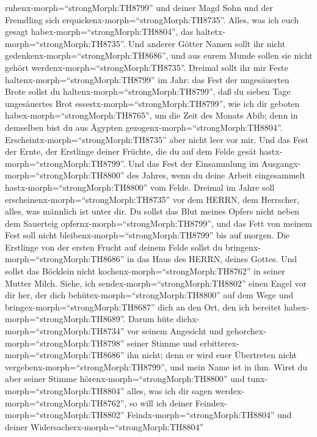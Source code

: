 ruhenx-morph=``strongMorph:TH8799'' und deiner Magd Sohn und der
Fremdling sich erquickenx-morph=``strongMorph:TH8735''. 
Alles, was ich euch gesagt habex-morph=``strongMorph:TH8804'', das
haltetx-morph=``strongMorph:TH8735''. Und anderer Götter Namen sollt ihr
nicht gedenkenx-morph=``strongMorph:TH8686'', und aus eurem Munde sollen
sie nicht gehört werdenx-morph=``strongMorph:TH8735''. 
Dreimal sollt ihr mir Feste haltenx-morph=``strongMorph:TH8799'' im
Jahr:  das Fest der ungesäuerten Brote sollst du
haltenx-morph=``strongMorph:TH8799'', daß du sieben Tage ungesäuertes
Brot essestx-morph=``strongMorph:TH8799'', wie ich dir geboten
habex-morph=``strongMorph:TH8765'', um die Zeit des Monats Abib; denn in
demselben bist du aus Ägypten gezogenx-morph=``strongMorph:TH8804''.
Erscheintx-morph=``strongMorph:TH8735'' aber nicht leer vor mir.
 Und das Fest der Ernte, der Erstlinge deiner Früchte, die
du auf dem Felde gesät hastx-morph=``strongMorph:TH8799''. Und das Fest
der Einsammlung im Ausgangx-morph=``strongMorph:TH8800'' des Jahres,
wenn du deine Arbeit eingesammelt hastx-morph=``strongMorph:TH8800'' vom
Felde.  Dreimal im Jahre soll
erscheinenx-morph=``strongMorph:TH8735'' vor dem HERRN, dem Herrscher,
alles, was männlich ist unter dir.  Du sollst das Blut
meines Opfers nicht neben dem Sauerteig
opfernx-morph=``strongMorph:TH8799'', und das Fett von meinem Fest soll
nicht bleibenx-morph=``strongMorph:TH8799'' bis auf morgen.
 Die Erstlinge von der ersten Frucht auf deinem Felde
sollst du bringenx-morph=``strongMorph:TH8686'' in das Haus des HERRN,
deines Gottes. Und sollst das Böcklein nicht
kochenx-morph=``strongMorph:TH8762'' in seiner Mutter Milch.
 Siehe, ich sendex-morph=``strongMorph:TH8802'' einen Engel
vor dir her, der dich behütex-morph=``strongMorph:TH8800'' auf dem Wege
und bringex-morph=``strongMorph:TH8687'' dich an den Ort, den ich
bereitet habex-morph=``strongMorph:TH8689''.  Darum hüte
dichx-morph=``strongMorph:TH8734'' vor seinem Angesicht und
gehorchex-morph=``strongMorph:TH8798'' seiner Stimme und
erbitterex-morph=``strongMorph:TH8686'' ihn nicht; denn er wird euer
Übertreten nicht vergebenx-morph=``strongMorph:TH8799'', und mein Name
ist in ihm.  Wirst du aber seiner Stimme
hörenx-morph=``strongMorph:TH8800'' und
tunx-morph=``strongMorph:TH8804'' alles, was ich dir sagen
werdex-morph=``strongMorph:TH8762'', so will ich deiner
Feindex-morph=``strongMorph:TH8802'' Feindx-morph=``strongMorph:TH8804''
und deiner Widersacherx-morph=``strongMorph:TH8804''
